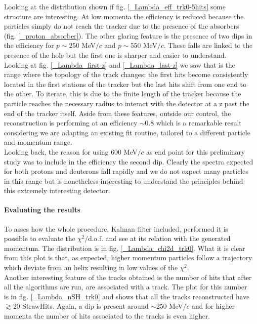 \documentclass[12pt,a4paper,openright, oneside, titlepage]{book} %
\begin{document}
\noindent Looking at the distribution shown if fig. \ref{_Lambda_eff_trk0-5hits} some structure are interesting. At low momenta the efficiency is reduced because the particles simply do not reach the tracker due to the presence of the absorbers (fig. \ref{_proton_absorber}). 
The other glaring feature is the presence of two dips in the efficiency for $p\sim250$ MeV$/c$ and $p\sim550$ MeV$/c$. 
These falls are linked to the presence of the hole but the first one is sharper and easier to understand. Looking at fig. \ref{_Lambda_first-z} and \ref{_Lambda_last-z} we saw that is the range where the topology of the track changes: the first hits become consistently located in the first stations of the tracker but the last hits shift from one end to the other. 
To iterate, this is due to the finite length of the tracker because the particle reaches the necessary radius to interact with the detector at a z past the end of the tracker itself.
Aside from these features, outside our control, the reconstruction is performing at an efficiency $\sim 0.8$ which is a remarkable result considering we are adapting an existing fit routine, tailored to a different particle and momentum range.\\

\noindent Looking back, the reason for using 600 MeV$/c$ as end point for this preliminary study was to include in the efficiency the second dip. 
Clearly the spectra expected for both protons and deuterons fall rapidly and we do not expect many particles in this range but is nonetheless interesting to understand the principles behind this extremely interesting detector.

\paragraph{Evaluating the results} 
To asses how the whole procedure, Kalman filter included, performed it is possible to evaluate the $\chi^2/\textrm{d.o.f.}$ and see at its relation with the generated momentum. The distribution is in fig. \ref{_Lambda_chi2d_trk0}. What it is clear from this plot is that, as expected, higher momentum particles follow a trajectory which deviate from an helix resulting in low values of the $\chi^2$. \\
Another interesting feature of the tracks obtained is the number of hits that after all the algorithms are run, are associated with a track. The plot for this number is in fig. \ref{_Lambda_nSH_trk0} and shows that all the tracks reconstructed have $\gtrsim 20$ StrawHits. Again, a dip is present around $\sim 250$ MeV$/c$ and for higher momenta the number of hits associated to the tracks is even higher.
\end{document}
